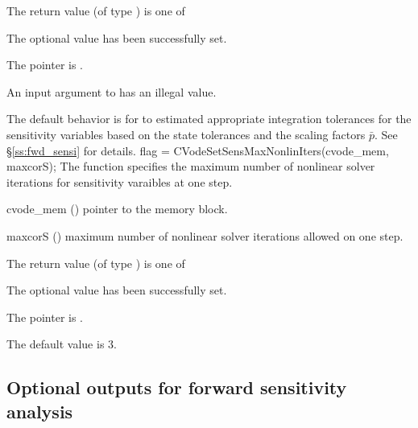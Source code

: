 {
  The return value  (of type ) is one of
  \begin{args}
  \item[\Id{SUCCESS}] 
    The optional value has been successfully set.
  \item[\Id{CVS\_NO\_MEM}]
    The  pointer is .
  \item[\Id{CVS\_ILL\_INPUT}]
     An input argument to  has an illegal value.
  \end{args}
}
{
  The default behavior is for  {\cvodes} to estimated appropriate integration 
  tolerances for the sensitivity variables based on the state tolerances and
  the scaling factors ${\bar p}$. See \S\ref{ss:fwd_sensi} for details.
}
{
  flag = CVodeSetSensMaxNonlinIters(cvode\_mem, maxcorS);
}
{
  The function  specifies the maximum
  number of nonlinear solver iterations for sensitivity varaibles at one step.
}
{
  \begin{args}
  \item[cvode\_mem] ()
    pointer to the {\cvodes} memory block.
  \item[maxcorS] ()
    maximum number of nonlinear solver iterations allowed on one step.
  \end{args}
}
{
  The return value  (of type ) is one of
  \begin{args}
  \item[\Id{SUCCESS}] 
    The optional value has been successfully set.
  \item[\Id{CVS\_NO\_MEM}]
    The  pointer is .
  \end{args}
}
{
  The default value is $3$.
}

\subsection{Optional outputs for forward sensitivity analysis}
\label{ss:sens_optional_output}

